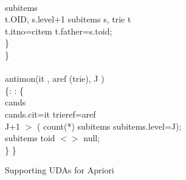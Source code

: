 {{{\begin{algorithm}[!htb]
\begin{algorithmic}[1]
  \hspace{.6cm}\\
  \STATE\hspace{.6cm}  subitems \\
  \hspace{.9cm} t.OID, s.level+1  subitems  s, trie  t\\
  \hspace{.9cm} t.itno=citem  t.father=s.toid;\\
  \hspace{.3cm}\}\\
  \STATE\}\\
  \\
  \STATE{} antimon(it , aref (trie), J )\\
  \STATE\{\hspace{.1cm}: : \{ \\
  \STATE\hspace{.6cm}  cands \\
  \hspace{.9cm} cands.cit=it  trieref=aref\\
  \hspace{1.3cm} J+1 $>$ ( count(*)  subitems  subitems.level=J);\\
  \STATE\hspace{.6cm}  subitems  toid $<>$ null;\\
  \hspace{.2cm}\}
  \STATE\}
\end{algorithmic}
\caption{Supporting UDAs for Apriori}
\label{alg:support}
\end{algorithm}


}}}
